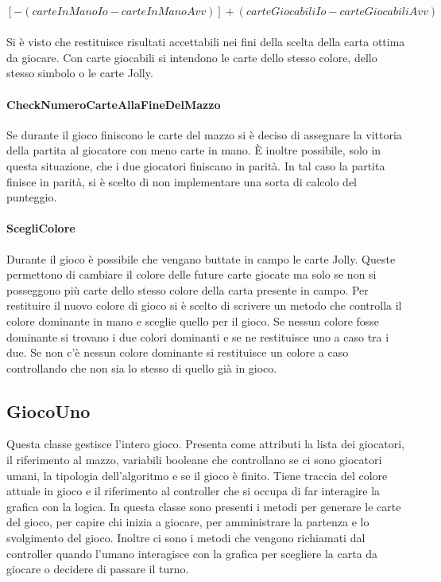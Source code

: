 $ [- (carteInManoIo - carteInManoAvv)] + (carteGiocabiliIo - carteGiocabiliAvv) $\\\\
		
		Si è visto che restituisce risultati accettabili nei fini della scelta della carta ottima da giocare. Con carte giocabili si intendono le carte dello stesso colore, dello stesso simbolo o le carte Jolly. 
		
		\paragraph{CheckNumeroCarteAllaFineDelMazzo}
		Se durante il gioco finiscono le carte del mazzo si è deciso di assegnare la vittoria della partita al giocatore con meno carte in mano. È inoltre possibile, solo in questa situazione, che i due giocatori finiscano in parità. In tal caso la partita finisce in parità, si è scelto di non implementare una sorta di calcolo del punteggio.
		
		\paragraph{ScegliColore}
		Durante il gioco è possibile che vengano buttate in campo le carte Jolly. Queste permettono di cambiare il colore delle future carte giocate ma solo se non si posseggono più carte dello stesso colore della carta presente in campo. Per restituire il nuovo colore di gioco si è scelto di scrivere un metodo che controlla il colore dominante in mano e sceglie quello per il gioco. Se nessun colore fosse dominante si trovano i due colori dominanti e se ne restituisce uno a caso tra i due. Se non c'è nessun colore dominante si restituisce un colore a caso controllando che non sia lo stesso di quello già in gioco.
	
	\subsection{GiocoUno}
		Questa classe gestisce l'intero gioco. Presenta come attributi la lista dei giocatori, il riferimento al mazzo, variabili booleane che controllano se ci sono giocatori umani, la tipologia dell'algoritmo e se il gioco è finito. Tiene traccia del colore attuale in gioco e il riferimento al controller che si occupa di far interagire la grafica con la logica. In questa classe sono presenti i metodi per generare le carte del gioco, per capire chi inizia a giocare, per amministrare la partenza e lo svolgimento del gioco. Inoltre ci sono i metodi che vengono richiamati dal controller quando l'umano interagisce con la grafica per scegliere la carta da giocare o decidere di passare il turno.

